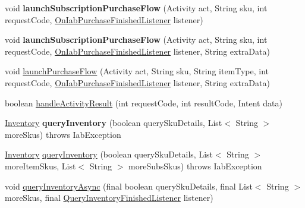 \begin{DoxyCompactItemize}
\item 
\mbox{\label{classorg_1_1cocos2dx_1_1plugin_1_1util_1_1IabHelper_a18ce37e93617117cc9e0f5855adf30b9}} 
void {\bfseries launch\+Subscription\+Purchase\+Flow} (Activity act, String sku, int request\+Code, \hyperlink{interfaceorg_1_1cocos2dx_1_1plugin_1_1util_1_1IabHelper_1_1OnIabPurchaseFinishedListener}{On\+Iab\+Purchase\+Finished\+Listener} listener)
\item 
\mbox{\label{classorg_1_1cocos2dx_1_1plugin_1_1util_1_1IabHelper_a44e6d577df50f413939efb1e9388cef6}} 
void {\bfseries launch\+Subscription\+Purchase\+Flow} (Activity act, String sku, int request\+Code, \hyperlink{interfaceorg_1_1cocos2dx_1_1plugin_1_1util_1_1IabHelper_1_1OnIabPurchaseFinishedListener}{On\+Iab\+Purchase\+Finished\+Listener} listener, String extra\+Data)
\item 
void \hyperlink{classorg_1_1cocos2dx_1_1plugin_1_1util_1_1IabHelper_ae2b1a25036d155bf35de7e7e59216196}{launch\+Purchase\+Flow} (Activity act, String sku, String item\+Type, int request\+Code, \hyperlink{interfaceorg_1_1cocos2dx_1_1plugin_1_1util_1_1IabHelper_1_1OnIabPurchaseFinishedListener}{On\+Iab\+Purchase\+Finished\+Listener} listener, String extra\+Data)
\item 
boolean \hyperlink{classorg_1_1cocos2dx_1_1plugin_1_1util_1_1IabHelper_af0723c16bd0dfe7d7037d2b28e80ff29}{handle\+Activity\+Result} (int request\+Code, int result\+Code, Intent data)
\item 
\mbox{\label{classorg_1_1cocos2dx_1_1plugin_1_1util_1_1IabHelper_a0527e5ec5db52957dc5ad50924d33717}} 
\hyperlink{classorg_1_1cocos2dx_1_1plugin_1_1util_1_1Inventory}{Inventory} {\bfseries query\+Inventory} (boolean query\+Sku\+Details, List$<$ String $>$ more\+Skus)  throws Iab\+Exception 
\item 
\hyperlink{classorg_1_1cocos2dx_1_1plugin_1_1util_1_1Inventory}{Inventory} \hyperlink{classorg_1_1cocos2dx_1_1plugin_1_1util_1_1IabHelper_af69d4ba377b9c8efd1eb115e339a1f14}{query\+Inventory} (boolean query\+Sku\+Details, List$<$ String $>$ more\+Item\+Skus, List$<$ String $>$ more\+Subs\+Skus)  throws Iab\+Exception 
\item 
void \hyperlink{classorg_1_1cocos2dx_1_1plugin_1_1util_1_1IabHelper_ab32d6d559bf5ae8289f996d1717b292e}{query\+Inventory\+Async} (final boolean query\+Sku\+Details, final List$<$ String $>$ more\+Skus, final \hyperlink{interfaceorg_1_1cocos2dx_1_1plugin_1_1util_1_1IabHelper_1_1QueryInventoryFinishedListener}{Query\+Inventory\+Finished\+Listener} listener)

\end{DoxyCompactItemize}
